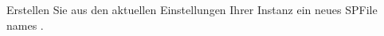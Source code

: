       \item Erstellen Sie aus den aktuellen Einstellungen Ihrer Instanz ein neues SPFile names \newline {}.
